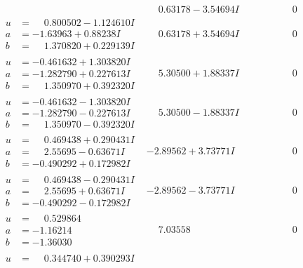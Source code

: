 \documentclass[1p]{elsarticle_modified}
\theoremstyle{definition}
\begin{document}
$$\begin{array}{c|c|c}
 & \phantom{-}0.63178 - 3.54694 I & \phantom{-0.000000 } 0 \\ \hline\begin{aligned}
u &= \phantom{-}0.800502 - 1.124610 I \\
a &= -1.63963 + 0.88238 I \\
b &= \phantom{-}1.370820 + 0.229139 I\end{aligned}
 & \phantom{-}0.63178 + 3.54694 I & \phantom{-0.000000 } 0 \\ \hline\begin{aligned}
u &= -0.461632 + 1.303820 I \\
a &= -1.282790 + 0.227613 I \\
b &= \phantom{-}1.350970 + 0.392320 I\end{aligned}
 & \phantom{-}5.30500 + 1.88337 I & \phantom{-0.000000 } 0 \\ \hline\begin{aligned}
u &= -0.461632 - 1.303820 I \\
a &= -1.282790 - 0.227613 I \\
b &= \phantom{-}1.350970 - 0.392320 I\end{aligned}
 & \phantom{-}5.30500 - 1.88337 I & \phantom{-0.000000 } 0 \\ \hline\begin{aligned}
u &= \phantom{-}0.469438 + 0.290431 I \\
a &= \phantom{-}2.55695 - 0.63671 I \\
b &= -0.490292 + 0.172982 I\end{aligned}
 & -2.89562 + 3.73771 I & \phantom{-0.000000 } 0 \\ \hline\begin{aligned}
u &= \phantom{-}0.469438 - 0.290431 I \\
a &= \phantom{-}2.55695 + 0.63671 I \\
b &= -0.490292 - 0.172982 I\end{aligned}
 & -2.89562 - 3.73771 I & \phantom{-0.000000 } 0 \\ \hline\begin{aligned}
u &= \phantom{-}0.529864\phantom{ +0.000000I} \\
a &= -1.16214\phantom{ +0.000000I} \\
b &= -1.36030\phantom{ +0.000000I}\end{aligned}
 & \phantom{-}7.03558\phantom{ +0.000000I} & \phantom{-0.000000 } 0 \\ \hline\begin{aligned}
u &= \phantom{-}0.344740 + 0.390293 I \\

\end{aligned}
\end{array}$$
\end{document}
